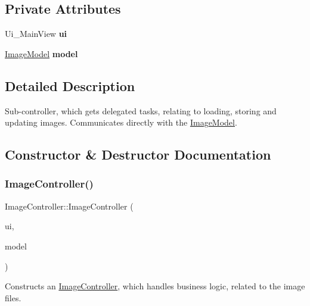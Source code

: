 \subsection*{Private Attributes}
\begin{DoxyCompactItemize}
\item 
\mbox{\label{classImageController_ac4a8d61dbfe0c1a0b63f7cd456b3c1c1}} 
Ui\+\_\+\+Main\+View {\bfseries ui}
\item 
\mbox{\label{classImageController_a7b83dbab8de169f4c1d394a72280aec5}} 
\hyperlink{classImageModel}{Image\+Model} {\bfseries model}
\end{DoxyCompactItemize}


\subsection{Detailed Description}
Sub-\/controller, which gets delegated tasks, relating to loading, storing and updating images. Communicates directly with the \hyperlink{classImageModel}{Image\+Model}. 

\subsection{Constructor \& Destructor Documentation}
\mbox{\label{classImageController_a317e49c29f50578a1001b73749151e3a}} 
\subsubsection{\texorpdfstring{Image\+Controller()}{ImageController()}}
{\footnotesize\ttfamily Image\+Controller\+::\+Image\+Controller (\begin{DoxyParamCaption}\item[{Ui\+\_\+\+Main\+View \&}]{ui,  }\item[{\hyperlink{classImageModel}{Image\+Model} \&}]{model }\end{DoxyParamCaption})}



Constructs an \hyperlink{classImageController}{Image\+Controller}, which handles business logic, related to the image files. 


